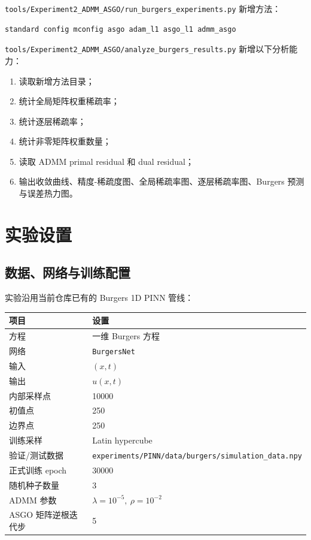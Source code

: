 \documentclass[UTF8,a4paper,12pt,fontset=none]{ctexart}
\begin{document}
\texttt{tools/Experiment2\_ADMM\_ASGO/run\_burgers\_experiments.py} 新增方法：

\begin{lstlisting}
standard config mconfig asgo adam_l1 asgo_l1 admm_asgo
\end{lstlisting}

\texttt{tools/Experiment2\_ADMM\_ASGO/analyze\_burgers\_results.py} 新增以下分析能力：

\begin{enumerate}
\item 读取新增方法目录；
\item 统计全局矩阵权重稀疏率；
\item 统计逐层稀疏率；
\item 统计非零矩阵权重数量；
\item 读取 ADMM primal residual 和 dual residual；
\item 输出收敛曲线、精度-稀疏度图、全局稀疏率图、逐层稀疏率图、Burgers 预测与误差热力图。
\end{enumerate}

\section{实验设置}

\subsection{数据、网络与训练配置}

实验沿用当前仓库已有的 Burgers 1D PINN 管线：

\begingroup
\small
\begin{longtable}{p{}p{}}
\toprule
项目 & 设置 \\
\midrule
方程 & 一维 Burgers 方程 \\
网络 & \texttt{BurgersNet} \\
输入 & $(x,t)$ \\
输出 & $u(x,t)$ \\
内部采样点 & 10000 \\
初值点 & 250 \\
边界点 & 250 \\
训练采样 & Latin hypercube \\
验证/测试数据 & \texttt{experiments/PINN/data/burgers/simulation\_data.npy} \\
正式训练 epoch & 30000 \\
随机种子数量 & 3 \\
ADMM 参数 & $\lambda=10^{-5},\ \rho=10^{-2}$ \\
ASGO 矩阵逆根迭代步 & 5 \\
\bottomrule
\end{longtable}
\endgroup
\end{document}
